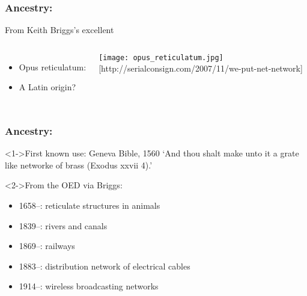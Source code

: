\begin{frame}
  \frametitle{Ancestry:}

  \begin{block}{
      From Keith Briggs's excellent
      }
    \begin{columns}
      \begin{itemize}
      \item<1-> 
        Opus reticulatum:
      \item<1-> 
        A Latin origin?
      \end{itemize}
      \texttt{[image: opus\_reticulatum.jpg]}\\
      {\tiny [http://serialconsign.com/2007/11/we-put-net-network]}
    \end{columns}
  \end{block}

\end{frame}

\begin{frame}
  \frametitle{Ancestry:}

  \begin{block}<1->{First known use: Geneva Bible, 1560}
    `And thou shalt make unto it a grate like networke of brass (Exodus xxvii 4).'
  \end{block}

  \begin{block}<2->{From the OED via Briggs:}
    \begin{itemize}
    \item<2-> 
      1658--: reticulate structures in animals
    \item<3-> 
      1839--: rivers and canals
    \item<4-> 
      1869--: railways
    \item<5-> 
      1883--: distribution network of electrical cables
    \item<6-> 
      1914--: wireless broadcasting networks
    \end{itemize}
  \end{block}

\end{frame}


